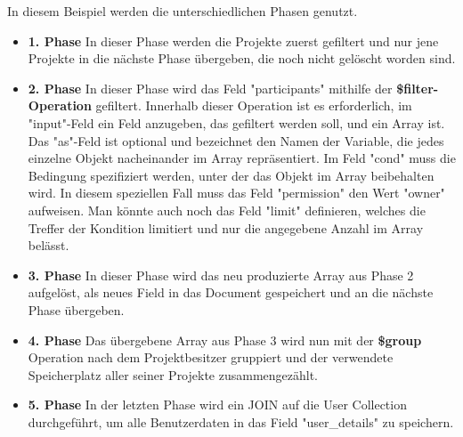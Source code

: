 In diesem Beispiel werden die unterschiedlichen Phasen genutzt.
\begin{itemize}
    \item \textbf{1. Phase}
        \newline
        In dieser Phase werden die Projekte zuerst gefiltert und nur jene Projekte in die nächste Phase übergeben, die noch nicht gelöscht worden sind.
    \item \textbf{2. Phase}
        \newline
        In dieser Phase wird das Feld "participants" mithilfe der \textbf{\$filter-Operation} gefiltert. Innerhalb dieser Operation ist es erforderlich, im "input"-Feld ein Feld anzugeben, das gefiltert werden soll, und ein Array ist. Das "as"-Feld ist optional und bezeichnet den Namen der Variable, die jedes einzelne Objekt nacheinander im Array repräsentiert. Im Feld "cond" muss die Bedingung spezifiziert werden, unter der das Objekt im Array beibehalten wird. In diesem speziellen Fall muss das Feld "permission" den Wert "owner" aufweisen. Man könnte auch noch das Feld "limit" definieren, welches die Treffer der Kondition limitiert und nur die angegebene Anzahl im Array belässt.
    \item \textbf{3. Phase}
        \newline
        In dieser Phase wird das neu produzierte Array aus Phase 2 aufgelöst, als neues Field in das Document gespeichert und an die nächste Phase übergeben.
    \item \textbf{4. Phase}
        \newline
        Das übergebene Array aus Phase 3 wird nun mit der \textbf{\$group} Operation nach dem Projektbesitzer gruppiert und der verwendete Speicherplatz aller seiner Projekte zusammengezählt.
    \item \textbf{5. Phase}
        \newline
        In der letzten Phase wird ein JOIN auf die User Collection durchgeführt, um alle Benutzerdaten in das Field "user\_details" zu speichern.
\end{itemize}
\cite{mongodb_aggregation_filter}